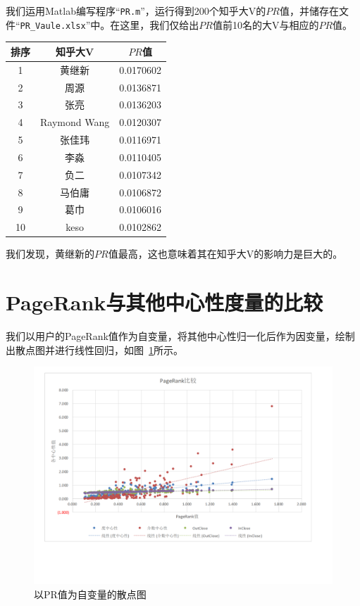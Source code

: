 \documentclass[a4paper]{article}
\begin{document}
\begin{spacing}{1.5}
我们运用Matlab编写程序``\texttt{PR.m}''，运行得到200个知乎大V的$PR$值，并储存在文件``\texttt{PR\_Vaule.xlsx}''中。在这里，我们仅给出$PR$值前10名的大V与相应的$PR$值。
\begin{center}
\begin{tabular}{ccc}
\toprule
排序& 知乎大V &  $PR$值\\
\midrule
1 & 黄继新 & 0.0170602\\
2  & 周源 & 0.0136871\\
3 & 张亮	 & 0.0136203\\
4 & Raymond Wang & 0.0120307\\
5 & 张佳玮 & 0.0116971\\
6 & 李淼 & 	0.0110405\\
7 & 负二	 & 0.0107342\\
8 & 马伯庸 & 0.0106872\\
9 & 葛巾	 & 0.0106016\\
10 & keso & 0.0102862\\
\bottomrule
\end{tabular}
\end{center}

我们发现，黄继新的$PR$值最高，这也意味着其在知乎大V的影响力是巨大的。
\newpage
\section{PageRank与其他中心性度量的比较}\label{sec6}
我们以用户的PageRank值作为自变量，将其他中心性归一化后作为因变量，绘制出散点图并进行线性回归，如图~\ref{bj}所示。
\begin{figure}[H]
  \centering
  \includegraphics[width=15cm]{fig/PageRank.pdf}
  \caption{以PR值为自变量的散点图}\label{bj}
\end{figure}



\end{spacing}
\end{document}
